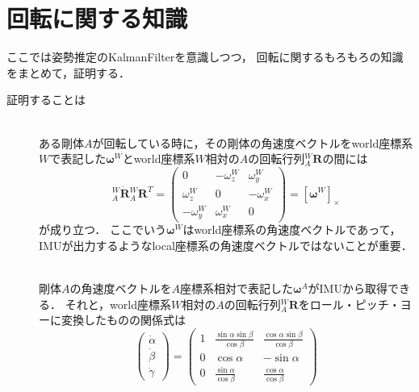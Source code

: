 \section{回転に関する知識} \label{sec:knowledge_about_rotation}

ここでは姿勢推定のKalmanFilterを意識しつつ，
回転に関するもろもろの知識をまとめて，証明する．

証明することは

\begin{description}
\item[]\mbox{}\\
  ある剛体$A$が回転している時に，その剛体の角速度ベクトルをworld座標系$W$で表記した$\boldsymbol{\omega}^{W}$とworld座標系$W$相対の$A$の回転行列${}^{W}_{A}\boldsymbol{R}$の間には
  \begin{equation}
    {}^{W}_{A}\dot{\boldsymbol{R}} {}^{W}_{A}\boldsymbol{R}^{T} =
    {\scriptstyle
      \begin{pmatrix}
        0  & -\omega^{W}_{z} & \omega^{W}_{y}\\
        \omega^{W}_{z} & 0 & -\omega^{W}_{x}\\
        - \omega^{W}_{y}  & \omega^{W}_{x} & 0
    \end{pmatrix}}
    = [\boldsymbol{\omega}^{W}]_{\times}
  \end{equation}
  が成り立つ．
  ここでいう$\boldsymbol{\omega}^{W}$はworld座標系の角速度ベクトルであって，
  IMUが出力するようなlocal座標系の角速度ベクトルではないことが重要．
\item[]\mbox{}\\
  剛体$A$の角速度ベクトルを$A$座標系相対で表記した$\boldsymbol{\omega}^{A}$がIMUから取得できる．
  それと，world座標系$W$相対の$A$の回転行列${}^{W}_{A}\boldsymbol{R}$をロール・ピッチ・ヨーに変換したものの関係式は
  \begin{equation}
    \begin{pmatrix}
      \dot{\alpha} \\
      \dot{\beta} \\
      \dot{\gamma}
    \end{pmatrix} =
    \begin{pmatrix}
      1 & \frac{\sin \alpha \sin \beta}{\cos \beta} & \frac{\cos \alpha \sin \beta}{\cos \beta} \\
      0 & \cos \alpha & - \sin \alpha \\
      0 & \frac{\sin \alpha}{\cos \beta} & \frac{\cos \alpha}{\cos \beta}
    \end{pmatrix}

\end{equation}
\end{description}
